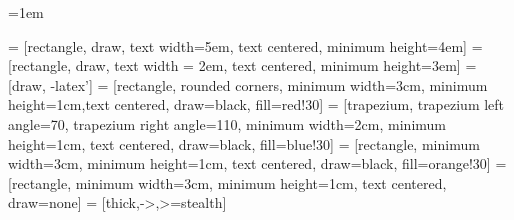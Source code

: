 
\usepackage[final]{microtype}
\emergencystretch=1em

\usepackage{csquotes}


\usepackage[final]{pdfpages}

\usepackage[parfill]{parskip}

\usepackage[hidelinks]{hyperref}


\usepackage{import}

\usepackage[acronyms,nonumberlist,nopostdot,sanitizesort=true,nogroupskip,toc]{glossaries}
\usepackage{acronym}
\usepackage{glossary-mcols}
\makenoidxglossaries
\usepackage[intoc]{nomencl}
\makenomenclature

\usepackage{tabularx}
\usepackage{adjustbox}
\usepackage{collectbox}

\usepackage{subcaption}
\usepackage{pgfplots}
\pgfplotsset{compat=1.15}
\usepackage{tikz}
\usetikzlibrary{plotmarks}
\usetikzlibrary{shapes,arrows,calc}
 = [rectangle, draw,
text width=5em, text centered, minimum height=4em]
 = [rectangle, draw, text width = 2em, text centered, minimum height=3em]
 = [draw, -latex']
 = [rectangle, rounded corners, minimum width=3cm, minimum height=1cm,text centered, draw=black, fill=red!30]
 = [trapezium, trapezium left angle=70, trapezium right angle=110, minimum width=2cm, minimum height=1cm, text centered, draw=black, fill=blue!30]
 = [rectangle, minimum width=3cm, minimum height=1cm, text centered, draw=black, fill=orange!30]
 = [rectangle, minimum width=3cm, minimum height=1cm, text centered, draw=none]
 = [thick,->,>=stealth]
\usetikzlibrary{arrows.meta}


\usepackage{amsmath, amssymb}
\usepackage{mathtools}

